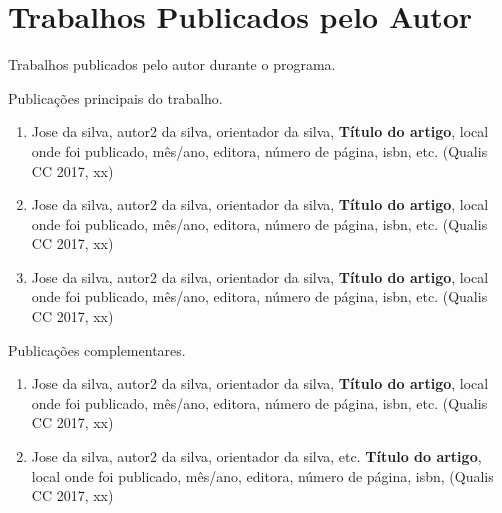 \documentclass[
	12pt,				%
	openright,			%
	oneside,			%
	a4paper,			%
	tccpreliminar,			%
	]{ABNT-DC-UEL}
\begin{document}
\chapter*{Trabalhos Publicados pelo Autor}

\noindent
Trabalhos publicados pelo autor durante o programa.


\vspace{12pt}

\noindent
Publicações principais do trabalho.

\begin{enumerate}

\item Jose da silva, autor2 da silva, orientador da silva, \textbf{Título do artigo}, local onde foi
publicado, mês/ano, editora, número de página, isbn, etc. (Qualis CC 2017, xx)

\item Jose da silva, autor2 da silva, orientador da silva, \textbf{Título do artigo}, local onde foi
publicado, mês/ano, editora, número de página, isbn, etc. (Qualis CC 2017, xx)

\item Jose da silva, autor2 da silva, orientador da silva, \textbf{Título do artigo}, local onde foi
publicado, mês/ano, editora, número de página, isbn, etc. (Qualis CC 2017, xx)

\end{enumerate}

\noindent
Publicações complementares.

\begin{enumerate}

\item Jose da silva, autor2 da silva, orientador da silva, \textbf{Título do artigo}, local onde foi
publicado, mês/ano, editora, número de página, isbn, etc. (Qualis CC 2017, xx)

\item Jose da silva, autor2 da silva, orientador da silva, etc. \textbf{Título do artigo}, local onde foi
publicado, mês/ano, editora, número de página, isbn, (Qualis CC 2017, xx)

\end{enumerate}



\printindex
\end{document}
